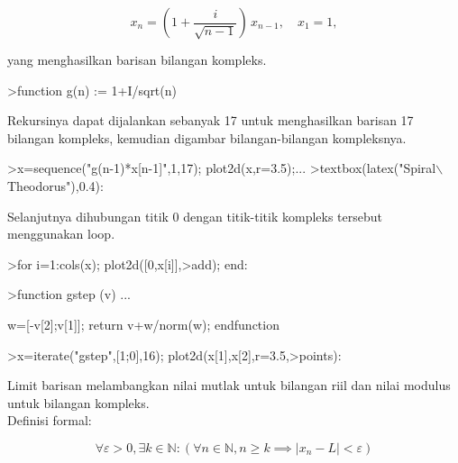 \documentclass[a4paper,10pt]{article}
\begin{document}
\begin{eulernotebook}
\begin{eulercomment}
\begin{eulercomment}
\begin{eulercomment}
\begin{eulercomment}
\begin{eulercomment}
\end{eulercomment}
\begin{eulerformula}
\[
x_n = \left( 1 + \frac{i}{\sqrt{n-1}} \right) \, x_{n-1}, \quad x_1=1,
\]
\end{eulerformula}
\begin{eulercomment}
yang menghasilkan barisan bilangan kompleks.
\end{eulercomment}
\begin{eulerprompt}
>function g(n) := 1+I/sqrt(n)
\end{eulerprompt}
\begin{eulercomment}
Rekursinya dapat dijalankan sebanyak 17 untuk menghasilkan barisan 17
bilangan kompleks, kemudian digambar bilangan-bilangan kompleksnya.
\end{eulercomment}
\begin{eulerprompt}
>x=sequence("g(n-1)*x[n-1]",1,17); plot2d(x,r=3.5);...
>textbox(latex("Spiral\(\backslash\) Theodorus"),0.4):
\end{eulerprompt}
\begin{eulercomment}
Selanjutnya dihubungan titik 0 dengan titik-titik kompleks tersebut
menggunakan loop.
\end{eulercomment}
\begin{eulerprompt}
>for i=1:cols(x); plot2d([0,x[i]],>add); end:
\end{eulerprompt}
\begin{eulerprompt}
>function gstep (v) ...
\end{eulerprompt}
\begin{eulerudf}
  w=[-v[2];v[1]];
  return v+w/norm(w);
  endfunction
\end{eulerudf}
\begin{eulerprompt}
>x=iterate("gstep",[1;0],16); plot2d(x[1],x[2],r=3.5,>points):
\end{eulerprompt}
\begin{eulercomment}
Limit barisan melambangkan nilai mutlak untuk bilangan riil dan nilai
modulus  untuk bilangan kompleks.\\
Definisi formal:\\
\end{eulercomment}
\begin{eulerformula}
\[
\forall \varepsilon > 0, \exists k \in \mathbb{N} : (\forall n \in \mathbb{N}, n \geq k \implies |x_n - L| <\varepsilon)
\]
\end{eulerformula}

\end{eulercomment}
\end{eulercomment}
\end{eulercomment}
\end{eulercomment}
\end{eulernotebook}
\end{document}
